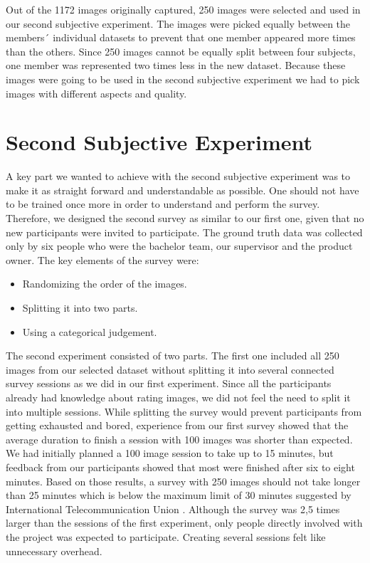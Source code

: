 Out of the 1172 images originally captured, 250 images were selected and used in our second subjective experiment. The images were picked equally between the members´ individual datasets to prevent that one member appeared more times than the others. Since 250 images cannot be equally split between four subjects, one member was represented two times less in the new dataset. Because these images were going to be used in the second subjective experiment we had to pick images with different aspects and quality. 


\section{Second Subjective Experiment}
\label{sec:secondse}
A key part we wanted to achieve with the second subjective experiment was to make it as straight forward and understandable as possible. One should not have to be trained once more in order to understand and perform the survey. Therefore, we designed the second survey as similar to our first one, given that no new participants were invited to participate. The ground truth data was collected only by six people who were the bachelor team, our supervisor and the product owner. The key elements of the survey were: 
\begin{itemize}
    \item Randomizing the order of the images.
    \item Splitting it into two parts. 
    \item Using a categorical judgement.
\end{itemize}

The second experiment consisted of two parts. The first one included all 250 images from our selected dataset without splitting it into several connected survey sessions as we did in our first experiment. Since all the participants already had knowledge about rating images, we did not feel the need to split it into multiple sessions. While splitting the survey would prevent participants from getting exhausted and bored, experience from our first survey showed that the average duration to finish a session with 100 images was shorter than expected. We had initially planned a 100 image session to take up to 15 minutes, but feedback from our participants showed that most were finished after six to eight minutes. Based on those results, a survey with 250 images should not take longer than 25 minutes which is below the maximum limit of 30 minutes suggested by International Telecommunication Union \cite{methodologySubjective}. Although the survey was 2,5 times larger than the sessions of the first experiment, only people directly involved with the project was expected to participate. Creating several sessions felt like unnecessary overhead. 

